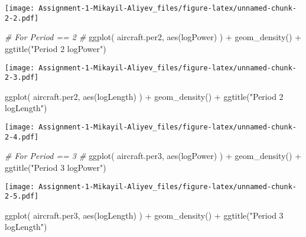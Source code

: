 \documentclass[
]{article}
\newenvironment{Shaded}{\begin{snugshade}}{\end{snugshade}}
\newcommand{\CommentTok}[1]{\textcolor[rgb]{0.56,0.35,0.01}{\textit{#1}}}
\newcommand{\FunctionTok}[1]{\textcolor[rgb]{0.00,0.00,0.00}{#1}}
\newcommand{\NormalTok}[1]{#1}
\newcommand{\SpecialCharTok}[1]{\textcolor[rgb]{0.00,0.00,0.00}{#1}}
\newcommand{\StringTok}[1]{\textcolor[rgb]{0.31,0.60,0.02}{#1}}
\begin{document}
\texttt{[image: Assignment-1-Mikayil-Aliyev\_files/figure-latex/unnamed-chunk-2-2.pdf]}

\begin{Shaded}
\begin{Highlighting}[]
\CommentTok{\# For Period == 2 \#}
\FunctionTok{ggplot}\NormalTok{( aircraft.per2, }\FunctionTok{aes}\NormalTok{(logPower)  ) }\SpecialCharTok{+} \FunctionTok{geom\_density}\NormalTok{() }\SpecialCharTok{+} \FunctionTok{ggtitle}\NormalTok{(}\StringTok{"Period 2 logPower"}\NormalTok{)}
\end{Highlighting}
\end{Shaded}

\texttt{[image: Assignment-1-Mikayil-Aliyev\_files/figure-latex/unnamed-chunk-2-3.pdf]}

\begin{Shaded}
\begin{Highlighting}[]
\FunctionTok{ggplot}\NormalTok{( aircraft.per2, }\FunctionTok{aes}\NormalTok{(logLength)  ) }\SpecialCharTok{+} \FunctionTok{geom\_density}\NormalTok{() }\SpecialCharTok{+} \FunctionTok{ggtitle}\NormalTok{(}\StringTok{"Period 2 logLength"}\NormalTok{)}
\end{Highlighting}
\end{Shaded}

\texttt{[image: Assignment-1-Mikayil-Aliyev\_files/figure-latex/unnamed-chunk-2-4.pdf]}

\begin{Shaded}
\begin{Highlighting}[]
\CommentTok{\# For Period == 3 \#}
\FunctionTok{ggplot}\NormalTok{( aircraft.per3, }\FunctionTok{aes}\NormalTok{(logPower)  ) }\SpecialCharTok{+} \FunctionTok{geom\_density}\NormalTok{() }\SpecialCharTok{+} \FunctionTok{ggtitle}\NormalTok{(}\StringTok{"Period 3 logPower"}\NormalTok{)}
\end{Highlighting}
\end{Shaded}

\texttt{[image: Assignment-1-Mikayil-Aliyev\_files/figure-latex/unnamed-chunk-2-5.pdf]}

\begin{Shaded}
\begin{Highlighting}[]
\FunctionTok{ggplot}\NormalTok{( aircraft.per3, }\FunctionTok{aes}\NormalTok{(logLength)  ) }\SpecialCharTok{+} \FunctionTok{geom\_density}\NormalTok{() }\SpecialCharTok{+} \FunctionTok{ggtitle}\NormalTok{(}\StringTok{"Period 3 logLength"}\NormalTok{)}
\end{Highlighting}
\end{Shaded}
\end{document}
